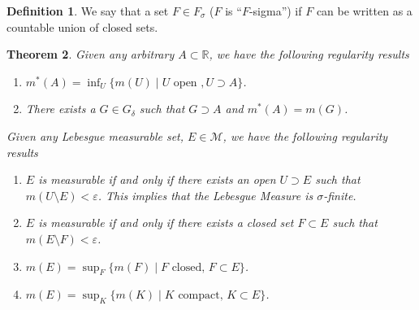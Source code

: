 \documentclass[12pt]{article}
\theoremstyle{plain}
\newtheorem{thm}{Theorem}[subsection]
\theoremstyle{definition}
\newtheorem{defn}[thm]{Definition}
\theoremstyle{remark}
\begin{document}
\begin{defn}
We say that a set $F\in F_\sigma$ ($F$ is ``$F$-sigma'') if $F$ can be written as a countable union of closed sets.
\end{defn}

\begin{thm}
\label{lebreg}
Given \emph{any} arbitrary $A\subset\mathbb{R}$, we have the following regularity results 
\begin{enumerate}

\item $m^*(A) = \inf_{U} \{m(U) \; | \; U \text{ open }, U\supset A\}$.

\item There exists a $G\in G_\delta$ such that $G\supset A$ and $m^*(A) = m(G)$.



\end{enumerate}
Given any Lebesgue \emph{measurable} set, $E\in\mathscr{M}$, we have the following regularity results 

\begin{enumerate}

\item $E$ is measurable if and only if there exists an open $U\supset E$ such that $m(U\setminus E)<\varepsilon$. This implies that the Lebesgue Measure is \emph{$\sigma$-finite}.

\item $E$ is measurable if and only if there exists a closed set $F\subset E$ such that $m(E\setminus F)<\varepsilon$. 

\item $m(E) = \sup_{F} \{m(F) \; | \; F \text{ closed, } F\subset E\}$.

\item $m(E) = \sup_{K} \{m(K) \; | \; K \text{ compact, }K\subset E\}$.

\end{enumerate}
\end{thm}
\end{document}
